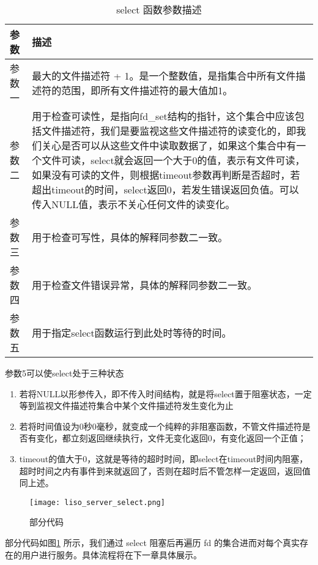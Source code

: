 \begin{table}[htbp!]
    \centering
    \begin{tabular}{p{40pt}p{300pt}}
        \hline
    参数  & 描述  \\\hline

    参数一 & 最大的文件描述符 + 1。是一个整数值，是指集合中所有文件描述符的范围，即所有文件描述符的最大值加1。 \\

    参数二 & 用于检查可读性，是指向fd\_set结构的指针，这个集合中应该包括文件描述符，我们是要监视这些文件描述符的读变化的，即我们关心是否可以从这些文件中读取数据了，如果这个集合中有一个文件可读，select就会返回一个大于0的值，表示有文件可读，如果没有可读的文件，则根据timeout参数再判断是否超时，若超出timeout的时间，select返回0，若发生错误返回负值。可以传入NULL值，表示不关心任何文件的读变化。\\

    参数三 & 用于检查可写性，具体的解释同参数二一致。 \\

    参数四 & 用于检查文件错误异常，具体的解释同参数二一致。 \\

    参数五 & 用于指定select函数运行到此处时等待的时间。                                        \\\hline
    \end{tabular}
    \caption{select 函数参数描述} \label{tb:select}
    \end{table}
参数5可以使select处于三种状态
\begin{enumerate}
    \item 若将NULL以形参传入，即不传入时间结构，就是将select置于阻塞状态，一定等到监视文件描述符集合中某个文件描述符发生变化为止
    \item 若将时间值设为0秒0毫秒，就变成一个纯粹的非阻塞函数，不管文件描述符是否有变化，都立刻返回继续执行，文件无变化返回0，有变化返回一个正值；
    \item timeout的值大于0，这就是等待的超时时间，即select在timeout时间内阻塞，超时时间之内有事件到来就返回了，否则在超时后不管怎样一定返回，返回值同上述。
\end{enumerate}

\begin{figure}[htbp!]
    \centering
    \texttt{[image: liso\_server\_select.png]}
    \caption{部分代码}\label{fig:SelectSource}
\end{figure}

部分代码如图\ref{fig:SelectSource} 所示，我们通过 select 阻塞后再遍历 fd 的集合进而对每个真实存在的用户进行服务。具体流程将在下一章具体展示。
